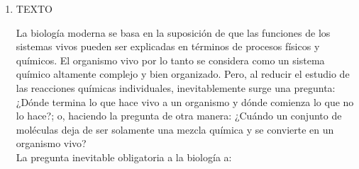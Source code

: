 \begin{enumerate}[resume]
	\textbf{Respuesta correcta:} d)
	
	\vspace{2mm}
	\textbf{Solucionario:}
	
	La palabra \textit{mefítico} se usa para describir algo que:
	
	\begin{itemize}[label=--]
		\item despide emanaciones fétidas o nocivas;
		\item tiene un olor desagradable;
		\item resulta dañino o difícil de respirar.
	\end{itemize}
	
	Por eso, el significado más próximo es:
	
	\[
	\text{mefítico} \approx \text{irrespirable}
	\]
	
	Revisemos las opciones:
	
	\begin{itemize}[label=--]
		\item a) \textit{inodoro}: significa sin olor, contrario a mefítico.
		\item b) \textit{corrosivo}: alude a lo que desgasta o quema, no al olor o al aire.
		\item c) \textit{insípido}: significa sin sabor.
		\item d) \textit{irrespirable}: que no se puede respirar o resulta nocivo al respirar. Es la mejor equivalencia.
		\item e) \textit{expansivo}: no guarda relación semántica.
	\end{itemize}
	
	Por lo tanto, el sinónimo correcto es .
	
	\vspace{6mm}
	
	\item \hfill TEXTO \hfill \null
	
	La biología moderna se basa en la suposición de que las funciones de los sistemas vivos pueden ser explicadas en términos de procesos físicos y químicos. El organismo vivo por lo tanto se considera como un sistema químico altamente complejo y bien organizado. Pero, al reducir el estudio de las reacciones químicas individuales, inevitablemente surge una pregunta: ¿Dónde termina lo que hace vivo a un organismo y dónde comienza lo que no lo hace?; o, haciendo la pregunta de otra manera: ¿Cuándo un conjunto de moléculas deja de ser solamente una mezcla química y se convierte en un organismo vivo?\\
	La pregunta inevitable obligatoria a la biología a:
	

\end{enumerate}
